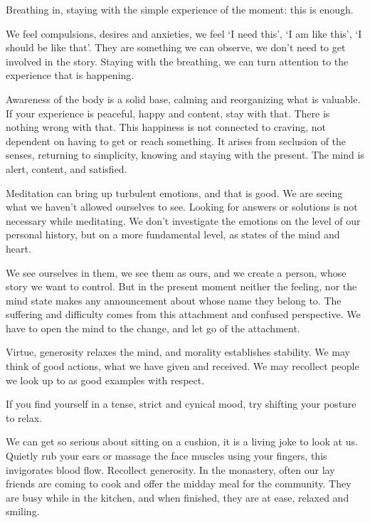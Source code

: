
Breathing in, staying with the simple experience of the moment: this is
enough.

We feel compulsions, desires and anxieties, we feel `I need this', `I am
like this', `I should be like that'. They are something we can observe,
we don't need to get involved in the story. Staying with the breathing,
we can turn attention to the experience that is happening.

Awareness of the body is a solid base, calming and reorganizing what is
valuable. If your experience is peaceful, happy and content, stay with
that. There is nothing wrong with that. This happiness is not connected
to craving, not dependent on having to get or reach something. It arises
from seclusion of the senses, returning to simplicity, knowing and
staying with the present. The mind is alert, content, and satisfied.

Meditation can bring up turbulent emotions, and that is good. We are
seeing what we haven't allowed ourselves to see. Looking for answers or
solutions is not necessary while meditating. We don't investigate the
emotions on the level of our personal history, but on a more fundamental
level, as states of the mind and heart.

We see ourselves in them, we see them as ours, and we create a person,
whose story we want to control. But in the present moment neither the
feeling, nor the mind state makes any announcement about whose name they
belong to. The suffering and difficulty comes from this attachment and
confused perspective. We have to open the mind to the change, and let go
of the attachment.


Virtue, generosity relaxes the mind, and morality establishes stability.
We may think of good actions, what we have given and received. We may
recollect people we look up to as good examples with respect.

If you find yourself in a tense, strict and cynical mood, try shifting
your posture to relax.

We can get so serious about sitting on a cushion, it is a living joke to
look at us. Quietly rub your ears or massage the face muscles using your
fingers, this invigorates blood flow. Recollect generosity. In the
monastery, often our lay friends are coming to cook and offer the midday
meal for the community. They are busy while in the kitchen, and when
finished, they are at ease, relaxed and smiling.

